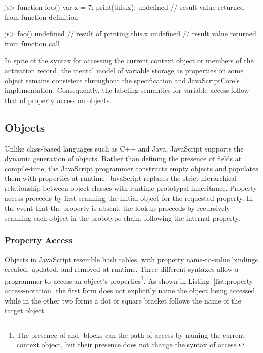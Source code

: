 \begin{jscode}
js> function foo() {
      var x = 7;
      print(this.x);
    }
undefined // result value returned from function definition

js> foo()
undefined // result of printing this.x
undefined // result value returned from function call
\end{jscode}

In spite of the syntax for accessing the current context object or members of the activation record, the mental model of variable storage as properties on some object remains consistent throughout the specification and JavaScriptCore's implementation.
Consequently, the labeling semantics for variable access follow that of property access on objects.

\subsection{Objects}

Unlike class-based languages such as C++ and Java, JavaScript supports the dynamic generation of objects.
Rather than defining the presence of fields at compile-time, the JavaScript programmer constructs empty objects and populates them with properties at runtime.
JavaScript replaces the strict hierarchical relationship between object classes with runtime prototypal inheritance.
Property access proceeds by first scanning the initial object for the requested property.
In the event that the property is absent, the lookup proceeds by recursively scanning each object in the prototype chain, following the internal  property.

\subsubsection{Property Access}

Objects in JavaScript resemble hash tables, with property name-to-value bindings created, updated, and removed at runtime.
Three different syntaxes allow a programmer to access an object's properties\footnote{The presence of  and -blocks can the path of access by naming the current context object, but their presence does not change the syntax of access.}.
As shown in Listing~\ref{list:property-access-notation} the first form does not explicitly name the object being accessed, while in the other two forms a dot or square bracket follows the name of the target object.

